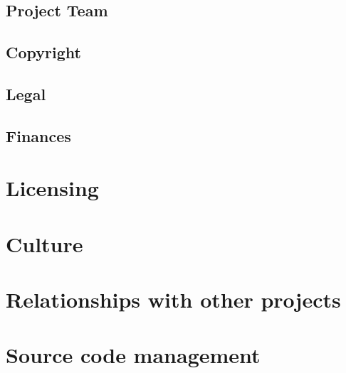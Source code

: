 \documentclass{article}
\begin{document}
\subsection{Project Team} %
\label{sub:project_team}


\subsection{Copyright} %
\label{sub:copyright}


\subsection{Legal} %
\label{sub:legal}


\subsection{Finances} %
\label{sub:finances}



\section{Licensing} %
\label{sec:licensing}


\section{Culture} %
\label{sec:culture}



\section{Relationships with other projects} %
\label{sec:relationships_with_other_projects}


\section{Source code management} %
\label{sec:source_code_management}
\end{document}
